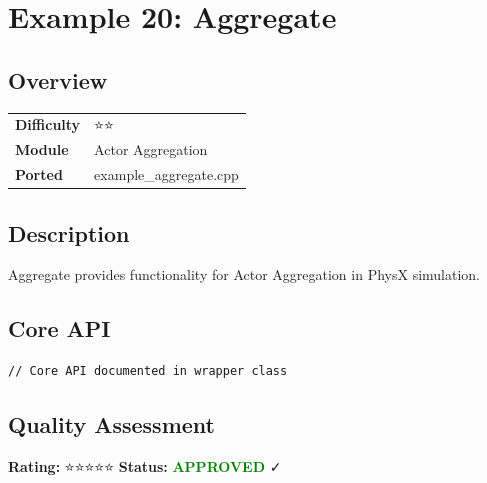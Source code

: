\section{Example 20: Aggregate}
\subsection{Overview}
\begin{table}[h]
\centering
\begin{tabular}{|l|l|}
\hline
\textbf{Difficulty} & ⭐⭐ \\
\textbf{Module} & Actor Aggregation \\
\textbf{Ported} & example\_aggregate.cpp \\
\hline
\end{tabular}
\end{table}

\subsection{Description}
Aggregate provides functionality for Actor Aggregation in PhysX simulation.

\subsection{Core API}
\begin{lstlisting}
// Core API documented in wrapper class
\end{lstlisting}

\subsection{Quality Assessment}
\textbf{Rating:} ⭐⭐⭐⭐⭐ \quad \textbf{Status:} \textcolor{green}{\textbf{APPROVED}} ✓
